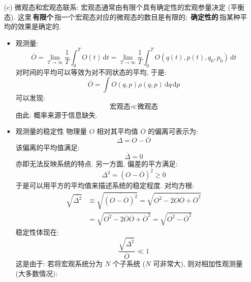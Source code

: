 (c) 微观态和宏观态联系: 宏观态通常由有限个具有确定性的宏观参量决定 (平衡态). 这里\,\textbf{有限个}\,指一个宏观态对应的微观态的数目是有限的; \,\textbf{确定性的}\,指某种平均的效果是确定的.
\begin{itemize}
    \item 观测量:
        \begin{equation}
            \overline{O} = \lim_{T \rightarrow \infty} \dfrac{1}{T} \int_{0}^{T} O(t) \,\mathrm{d} t = \lim_{T \rightarrow \infty} \dfrac{1}{T} \int_{0}^{T} O(q(t), p(t), q_0, p_0) \,\mathrm{d} t
        \end{equation}
        对时间的平均可以等效为对不同状态的平均, 于是:
        \begin{equation}
            \overline{O} = \int O(q, p) \rho(q, p) \,\mathrm{d}q\,\mathrm{d}p
        \end{equation}
        可以发现:
        \begin{equation*}
            \text{宏观态} \ll \text{微观态}
        \end{equation*}
        由此: 概率来源于信息缺失.
    \item 观测量的稳定性
        物理量 $ O $ 相对其平均值 $ \overline{O} $ 的偏离可表示为:
        \begin{equation}
            \Delta = O - \overline{O}
        \end{equation}
        该偏离的平均值满足:
        \begin{equation}
            \overline{\Delta} = 0
        \end{equation}
        亦即无法反映系统的特点. 另一方面, 偏差的平方满足:
        \begin{equation}
            \Delta^2 = (O - \overline{O})^2 \geq 0
        \end{equation}
        于是可以用平方的平均值来描述系统的稳定程度. 对均方根:
        \begin{align}
            \sqrt{\overline{\Delta^2}} & \equiv \sqrt{\overline{(O - \overline{O})^2}} = \sqrt{\overline{O^2 - 2O\overline{O} + \overline{O}^2}} \\
                                       & = \sqrt{\overline{O^2} - 2 \overline{O} \overline{O} + \overline{O}^2} = \sqrt{\overline{O^2} - \overline{O}^2}
        \end{align}
        稳定性体现在:
        \begin{equation}
            \dfrac{\sqrt{\overline{\Delta^2}}}{\overline{O}} \ll 1
        \end{equation}
        这是由于: 若将宏观系统分为 $ N $ 个子系统 ($ N $ 可非常大), 则对相加性观测量 (大多数情况):

\end{itemize}

